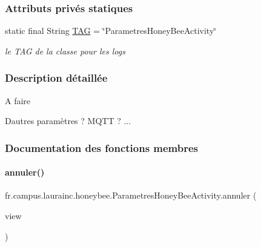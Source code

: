 \subsubsection*{Attributs privés statiques}
\begin{DoxyCompactItemize}
\item 
static final String \hyperlink{classfr_1_1campus_1_1laurainc_1_1honeybee_1_1_parametres_honey_bee_activity_a9fcf6f5bb050914a6f719f04870f1494}{T\+AG} = \char`\"{}Parametres\+Honey\+Bee\+Activity\char`\"{}
\begin{DoxyCompactList}\small\item\em le T\+AG de la classe pour les logs \end{DoxyCompactList}\end{DoxyCompactItemize}


\subsubsection{Description détaillée}
\begin{DoxyRefDesc}{A faire}
\item[\hyperlink{todo__todo000004}{A faire}]D\textquotesingle{}autres paramètres ? M\+Q\+TT ? ... \end{DoxyRefDesc}


\subsubsection{Documentation des fonctions membres}
\mbox{\label{classfr_1_1campus_1_1laurainc_1_1honeybee_1_1_parametres_honey_bee_activity_a1db4c582af1057bf1577b1f7a74ea8fe}} 
\paragraph{\texorpdfstring{annuler()}{annuler()}}
{\footnotesize\ttfamily fr.\+campus.\+laurainc.\+honeybee.\+Parametres\+Honey\+Bee\+Activity.\+annuler (\begin{DoxyParamCaption}\item[{View}]{view }\end{DoxyParamCaption})}


